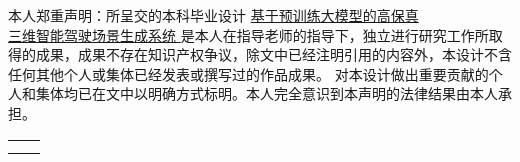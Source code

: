 
\begin{declarationzh}
	
	本人郑重声明：所呈交的本科毕业设计 \uline{ 基于预训练大模型的高保真\\三维智能驾驶场景生成系统 } 是本人在指导老师的指导下，独立进行研究工作所取得的成果，成果不存在知识产权争议，除文中已经注明引用的内容外，本设计不含任何其他个人或集体已经发表或撰写过的作品成果。
	对本设计做出重要贡献的个人和集体均已在文中以明确方式标明。本人完全意识到本声明的法律结果由本人承担。
	
	\vspace{30pt}
	\begin{tabular}{ll}
		\hspace{240pt} \makebox[4em][s]{作者签名：} & \underline{\makebox[100pt][c]{ 郑睿翔 }} \\
		\hspace{240pt} \makebox[4em][s]{日\qquad 期:}	 &
		\underline{\makebox[100pt][c]{\qquad 2025年\quad 4月\quad  28 日 }} \\
	\end{tabular}
	
	
	
\end{declarationzh}